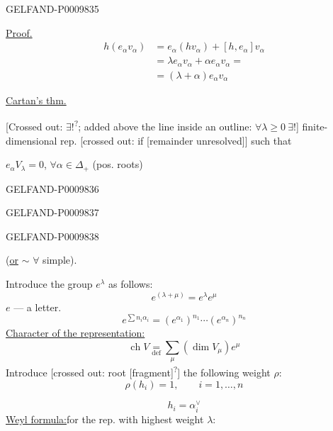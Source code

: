 \begin{GelfandAdjacentEvidence}{GELFAND-P000983}{5}


\underline{Proof.}
\begin{align*}
h(e_\alpha v_\alpha)
 &=e_\alpha(hv_\alpha)+[h,e_\alpha]v_\alpha\\
 &=\lambda e_\alpha v_\alpha+\alpha e_\alpha v_\alpha=\\
 &=(\lambda+\alpha)e_\alpha v_\alpha
\end{align*}

 \underline{Cartan's thm.}

[Crossed out: $\exists!$\textsuperscript{?}; added above the line inside an outline: $\forall\lambda\geq0\ \exists!$] finite-dimensional rep. [crossed out: if [remainder unresolved]] such that

$e_\alpha V_\lambda=0$, $\forall\alpha\in\Delta_+$ (pos. roots)
\end{GelfandAdjacentEvidence}
\begin{GelfandAdjacentEvidence}{GELFAND-P000983}{6}

\end{GelfandAdjacentEvidence}
\begin{GelfandAdjacentEvidence}{GELFAND-P000983}{7}

\end{GelfandAdjacentEvidence}
\begin{GelfandAdjacentEvidence}{GELFAND-P000983}{8}


(\underline{or} $\sim$ $\forall$ simple).

Introduce the group $e^\lambda$ as follows:
\[
e^{(\lambda+\mu)}=e^\lambda e^\mu
\]
$e$ --- a letter.
\[
e^{\sum n_i\alpha_i}=(e^{\alpha_1})^{n_1}\cdots(e^{\alpha_n})^{n_n}
\]
\underline{Character of the representation:}
\[
\operatorname{ch}V\underset{\mathrm{def}}{=}\sum_\mu(\dim V_\mu)e^\mu
\]
Introduce [crossed out: root [fragment]\textsuperscript{?}] the following weight $\rho$:
\[
\rho(h_i)=1,\qquad i=1,\ldots,n
\]
\end{GelfandAdjacentEvidence}

\[
h_i=\alpha_i^{\vee}
\]
\underline{Weyl formula:}\qquad for the rep. with highest weight $\lambda$:


